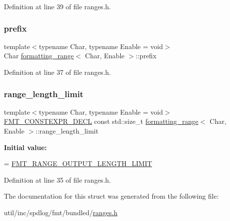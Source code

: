 Definition at line 39 of file ranges.\+h.

\mbox{\label{structformatting__range_ada7fe968f694ec53469019303193c91c}} 
\subsubsection{\texorpdfstring{prefix}{prefix}}
{\footnotesize\ttfamily template$<$typename Char, typename Enable = void$>$ \\
Char \hyperlink{structformatting__range}{formatting\+\_\+range}$<$ Char, Enable $>$\+::prefix}



Definition at line 37 of file ranges.\+h.

\mbox{\label{structformatting__range_ab04cc7d9dcb2abd142011edd971129d1}} 
\subsubsection{\texorpdfstring{range\+\_\+length\+\_\+limit}{range\_length\_limit}}
{\footnotesize\ttfamily template$<$typename Char, typename Enable = void$>$ \\
\hyperlink{core_8h_af4388801466a5994a363d6005616371a}{F\+M\+T\+\_\+\+C\+O\+N\+S\+T\+E\+X\+P\+R\+\_\+\+D\+E\+CL} const std\+::size\+\_\+t \hyperlink{structformatting__range}{formatting\+\_\+range}$<$ Char, Enable $>$\+::range\+\_\+length\+\_\+limit\hspace{0.3cm}{\ttfamily [static]}}

{\bfseries Initial value\+:}
\begin{DoxyCode}
=
      \hyperlink{ranges_8h_ad1c3ab4ad2c95d3f313323dbef5585df}{FMT\_RANGE\_OUTPUT\_LENGTH\_LIMIT}
\end{DoxyCode}


Definition at line 35 of file ranges.\+h.



The documentation for this struct was generated from the following file\+:\begin{DoxyCompactItemize}
\item 
util/inc/spdlog/fmt/bundled/\hyperlink{ranges_8h}{ranges.\+h}\end{DoxyCompactItemize}
